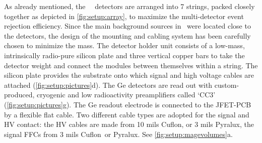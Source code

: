 As already mentioned, the \gerda\ \phasetwo\ detectors are arranged into 7 strings, packed
closely together as depicted in \cref{fig:setup:array}, to maximize the multi-detector
event rejection efficiency. Since the main background sources in \phaseone\ were located
close to the detectors, the design of the mounting and cabling system has been carefully
chosen to minimize the mass. The detector holder unit consists of a low-mass,
intrinsically radio-pure silicon plate and three vertical copper bars to take the detector
weight and connect the modules between themselves within a string. The silicon plate
provides the substrate onto which signal and high voltage cables are attached
(\cref{fig:setup:pictures}d). The Ge detectors are read out with custom-produced,
cryogenic and low radioactivity preamplifiers called `CC3'~\cite{Riboldi2015}
(\cref{fig:setup:pictures}g). The Ge readout electrode is connected to the JFET-PCB by a
flexible flat cable. Two different cable types are adopted for the signal and HV contact:
the HV cables are made from 10 mils Cuflon\reg, or 3 mils Pyralux\reg, the signal FFCs
from 3 mils Cuflon\reg\ or Pyralux\reg. See \cref{fig:setup:magevolumes}a.


